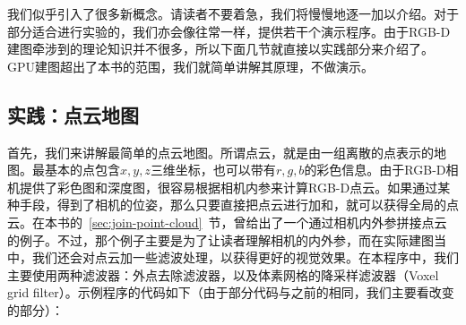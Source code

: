 我们似乎引入了很多新概念。请读者不要着急，我们将慢慢地逐一加以介绍。对于部分适合进行实验的，我们亦会像往常一样，提供若干个演示程序。由于RGB-D建图牵涉到的理论知识并不很多，所以下面几节就直接以实践部分来介绍了。GPU建图超出了本书的范围，我们就简单讲解其原理，不做演示。

\subsection{实践：点云地图}
首先，我们来讲解最简单的点云地图。所谓点云，就是由一组离散的点表示的地图。最基本的点包含$x,y,z$三维坐标，也可以带有$r,g,b$的彩色信息。由于RGB-D相机提供了彩色图和深度图，很容易根据相机内参来计算RGB-D点云。如果通过某种手段，得到了相机的位姿，那么只要直接把点云进行加和，就可以获得全局的点云。在本书的~\ref{sec:join-point-cloud}~节，曾给出了一个通过相机内外参拼接点云的例子。不过，那个例子主要是为了让读者理解相机的内外参，而在实际建图当中，我们还会对点云加一些滤波处理，以获得更好的视觉效果。在本程序中，我们主要使用两种滤波器：外点去除滤波器，以及体素网格的降采样滤波器（Voxel grid filter）。示例程序的代码如下（由于部分代码与之前的相同，我们主要看改变的部分）：
